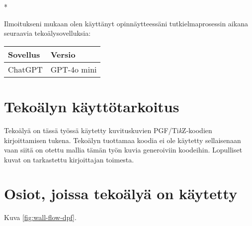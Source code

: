 \begin{aidisclaimer} * %

Ilmoitukseni mukaan olen käyttänyt opinnäytteessäni tutkielmaprosessin aikana
seuraavia tekoälysovelluksia:

\begin{center}
    \begin{tabularx}{\linewidth}{X|l}
        \toprule
        \textbf{Sovellus} & \textbf{Versio} \\
        \midrule
        ChatGPT & GPT-4o mini \\
        \bottomrule
    \end{tabularx}
\end{center}

\section*{Tekoälyn käyttötarkoitus}

Tekoälyä on tässä työssä käytetty kuvituskuvien PGF/Ti\emph{k}Z-koodien kirjoittamisen tukena. Tekoälyn tuottamaa koodia ei ole käytetty sellaisenaan vaan siitä on otettu mallia tämän työn kuvia generoiviin koodeihin.
Lopulliset kuvat on tarkastettu kirjoittajan toimesta.

\section*{Osiot, joissa tekoälyä on käytetty}

Kuva \ref{fig:wall-flow-dpf}.

\end{aidisclaimer}
